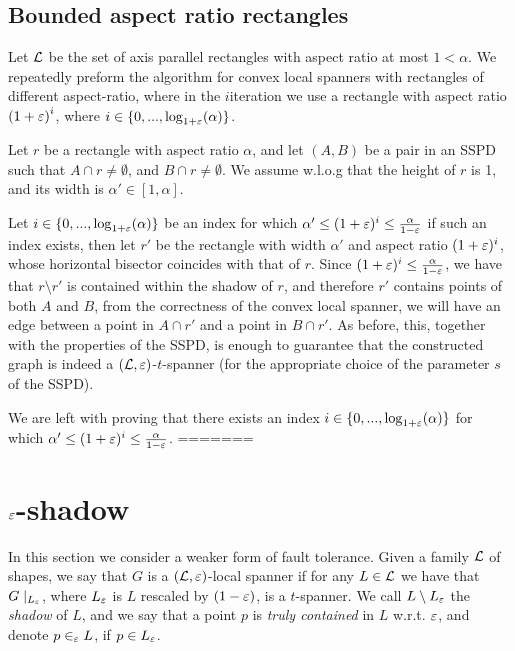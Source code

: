 \documentclass[12pt]{article}%
\begin{document}
\subsection{Bounded aspect ratio rectangles}
Let $\mathcal{L}$ be the set of axis parallel rectangles with aspect ratio at
most $1<\alpha$. We repeatedly preform the algorithm for convex local
spanners with rectangles of different aspect-ratio, where in the
$i$\th iteration we use a rectangle with aspect ratio
$\left(1+\varepsilon\right)^i$, where $i\in\{0,...,\log_{1+\varepsilon}(\alpha)\}$.

Let $r$ be a rectangle with aspect ratio $\alpha$, and let $(A,B)$ be
a pair in an SSPD such that $A\cap r\neq \emptyset$, and
$B\cap r\neq \emptyset$. We assume w.l.o.g that the height of $r$ is
1, and its width is $\alpha'\in [1,\alpha]$.

Let $i\in \{0,...,\log_{1+\varepsilon}(\alpha)\}$ be an index for which
$\alpha' \leq (1+\varepsilon)^i \leq \frac{\alpha}{1-\varepsilon}$ if such an index
exists, then let $r'$ be the rectangle with width $\alpha'$ and aspect
ratio $(1+\varepsilon)^i$, whose horizontal bisector coincides with that of
$r$. Since $(1+\varepsilon)^i \leq \frac{\alpha}{1-\varepsilon}$, we have that
$r\setminus r'$ is contained within the shadow of $r$, and therefore
$r'$ contains points of both $A$ and $B$, from the correctness of the
convex local spanner, we will have an edge between a point in
$A\cap r'$ and a point in $B\cap r'$. As before, this, together with
the properties of the SSPD, is enough to guarantee that the
constructed graph is indeed a $(\mathcal{L}, \varepsilon)$-$t$-spanner (for the
appropriate choice of the parameter $s$ of the SSPD).

We are left with proving that there exists an index
$i\in \{0,...,\log_{1+\varepsilon}(\alpha)\}$ for which
$\alpha' \leq (1+\varepsilon)^i \leq \frac{\alpha}{1-\varepsilon}$.
=======

	\section{$\varepsilon$-shadow}
In this section we consider a weaker form of fault tolerance. Given a family $\mathcal{L}$ of shapes, we say that $G$ is a $(\mathcal{L},\varepsilon)$-local spanner if for any $L\in\mathcal{L}$ we have that $G\mid_{L_{\varepsilon}}$, where $L_{\varepsilon}$ is $L$ rescaled by $(1-\varepsilon)$, is a $t$-spanner. We call $L\setminus L_{\varepsilon}$ the \emph{shadow} of $L$, and we say that a point $p$ is \emph{truly contained} in $L$ w.r.t. $\varepsilon$, and denote $p\in_{\varepsilon} L$, if $p\in L_{\varepsilon}$. 
\end{document}

